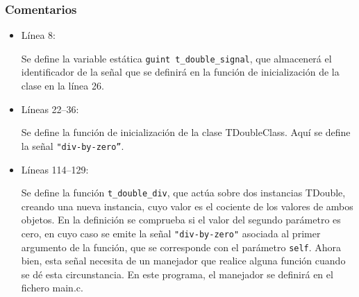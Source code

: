\subsubsection{Comentarios}
\begin{itemize}
\item Línea 8:\par
  Se define la variable estática \texttt{guint t\_double\_signal}, que almacenerá el identificador de la
  señal que se definirá en la función de inicialización de la clase en la línea 26.
\item Líneas 22--36:\par
  Se define la función de inicialización de la clase \textsf{TDoubleClass}. Aquí se define la señal
  \texttt{"div-by-zero''}.
\item Líneas 114--129:\par
  Se define la función \texttt{t\_double\_div}, que actúa sobre dos instancias \textsf{TDouble},
  creando una nueva instancia, cuyo valor es el cociente de los valores de ambos objetos.
  En la definición se comprueba si el valor del segundo parámetro es cero, en cuyo caso se
  emite la señal \texttt{"div-by-zero"} asociada al primer argumento de la función, que se corresponde
  con el parámetro \texttt{self}. Ahora bien, esta señal necesita de un manejador que
  realice alguna función cuando se dé esta circunstancia. En este programa, el manejador se
  definirá en el fichero \textsf{main.c}.
\end{itemize}

